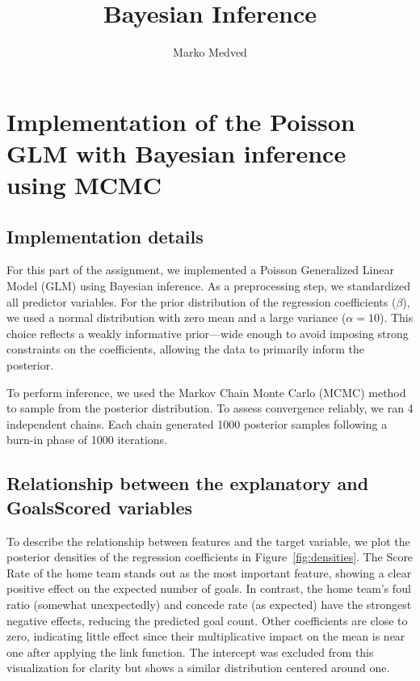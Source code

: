 \documentclass[9pt]{IEEEtran}
\title{\vspace{0ex}
Bayesian Inference}
\author{Marko Medved\vspace{-4.0ex}}
\begin{document}
\maketitle

\section{Implementation of the Poisson GLM with Bayesian inference using MCMC}

\subsection{Implementation details}

For this part of the assignment, we implemented a Poisson
 Generalized Linear Model (GLM) using Bayesian inference. As
  a preprocessing step, we standardized all predictor variables.
   For the prior distribution of 
  the regression coefficients ($\beta$), we used a normal distribution
   with zero mean and a large variance ($\alpha = 10$). This
    choice reflects a weakly informative prior—wide enough to avoid 
    imposing strong constraints on the coefficients,
     allowing the data to primarily inform the posterior.

To perform inference, we used the Markov Chain Monte Carlo (MCMC)
 method to sample from the posterior distribution. To assess 
 convergence reliably, we ran 4 independent chains. Each chain 
 generated 1000 posterior samples following a burn-in phase of 1000
  iterations.

\subsection{Relationship between the explanatory and GoalsScored variables}
To describe the relationship between features and the target variable, 
we plot the posterior densities of the regression coefficients in
 Figure~\ref{fig:densities}. The Score Rate of the home team stands 
 out as the most important feature, showing a clear positive effect
  on the expected number of goals.
   In contrast, the home team’s foul ratio (somewhat unexpectedly) 
   and concede rate (as expected) have the strongest negative 
   effects, reducing the predicted goal count. Other coefficients are
    close to zero, indicating little effect since their multiplicative 
    impact on the mean is near one after applying the link function. 
    The intercept was excluded from this visualization for clarity but 
    shows a similar distribution centered around one.
\end{document}
